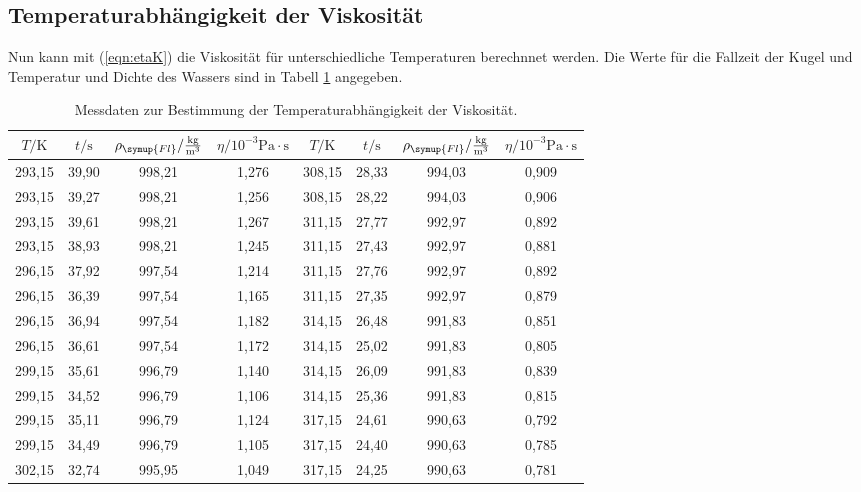 \subsection{Temperaturabhängigkeit der Viskosität}
\label{sec:TempVisk}
Nun kann mit (\ref{eqn:etaK}) die Viskosität für unterschiedliche Temperaturen berechnnet werden. Die Werte für die Fallzeit der Kugel und Temperatur und Dichte \cite{waterdensity}
 des Wassers sind
in Tabell \ref{tab:Temp} angegeben.

\begin{table}
  \centering
  \caption{Messdaten zur Bestimmung der Temperaturabhängigkeit der Viskosität.}
  \label{tab:Temp}
  \begin{tabular}{c c c c | c c c c}
    \toprule
    $T/\unit{\kelvin}$ & $t/\unit{\second}$ & $\rho_{\symup{Fl}}/\frac{\unit{\kilo\gram}}{\unit{\meter^3}}$ & $\eta/10^{-3}\unit{\pascal}\cdot \unit{\second}$ & $T/\unit{\kelvin}$ & $t/\unit{\second}$ & $\rho_{\symup{Fl}}/\frac{\unit{\kilo\gram}}{\unit{\meter^3}}$ & $\eta/10^{-3}\unit{\pascal}\cdot \unit{\second}$ \\
    \midrule
    293,15 & 39,90 & 998,21 & 1,276 & 308,15 & 28,33 & 994,03 & 0,909 \\
    293,15 & 39,27 & 998,21 & 1,256 & 308,15 & 28,22 & 994,03 & 0,906 \\
    293,15 & 39,61 & 998,21 & 1,267 & 311,15 & 27,77 & 992,97 & 0,892 \\
    293,15 & 38,93 & 998,21 & 1,245 & 311,15 & 27,43 & 992,97 & 0,881 \\
    296,15 & 37,92 & 997,54 & 1,214 & 311,15 & 27,76 & 992,97 & 0,892 \\
    296,15 & 36,39 & 997,54 & 1,165 & 311,15 & 27,35 & 992,97 & 0,879 \\
    296,15 & 36,94 & 997,54 & 1,182 & 314,15 & 26,48 & 991,83 & 0,851 \\
    296,15 & 36,61 & 997,54 & 1,172 & 314,15 & 25,02 & 991,83 & 0,805 \\
    299,15 & 35,61 & 996,79 & 1,140 & 314,15 & 26,09 & 991,83 & 0,839 \\
    299,15 & 34,52 & 996,79 & 1,106 & 314,15 & 25,36 & 991,83 & 0,815 \\
    299,15 & 35,11 & 996,79 & 1,124 & 317,15 & 24,61 & 990,63 & 0,792 \\
    299,15 & 34,49 & 996,79 & 1,105 & 317,15 & 24,40 & 990,63 & 0,785 \\
    302,15 & 32,74 & 995,95 & 1,049 & 317,15 & 24,25 & 990,63 & 0,781 \\

\end{tabular}
\end{table}
